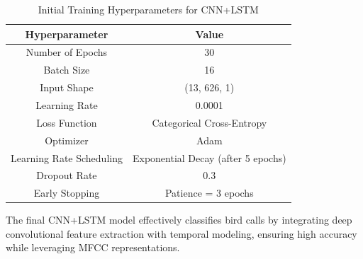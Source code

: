       \begin{table}[h]
      \centering
      \caption{Initial Training Hyperparameters for CNN+LSTM}
      \label{tab:training_hyperparameters_cnnlstm}
      \begin{tabular}{|c|c|}
            \hline
            \textbf{Hyperparameter} & \textbf{Value} \\
            \hline
            Number of Epochs & 30 \\
            \hline
            Batch Size & 16 \\
            \hline
            Input Shape & (13, 626, 1) \\
            \hline
            Learning Rate & 0.0001 \\
            \hline
            Loss Function & Categorical Cross-Entropy \\
            \hline
            Optimizer & Adam \\
            \hline
            Learning Rate Scheduling & Exponential Decay (after 5 epochs) \\
            \hline
            Dropout Rate & 0.3 \\
            \hline
            Early Stopping & Patience = 3 epochs \\
            \hline
      \end{tabular}
      \end{table}

      The final CNN+LSTM model effectively classifies bird calls by integrating deep convolutional feature extraction with temporal modeling, ensuring high accuracy while leveraging MFCC representations.



        
        
